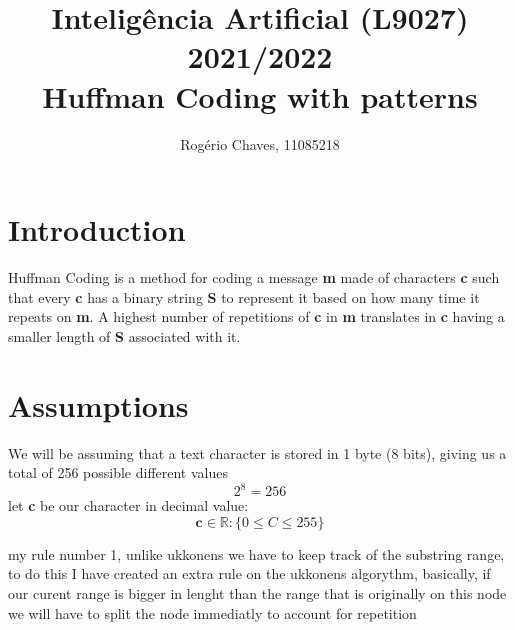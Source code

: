\documentclass[12pt]{article}
\begin{document}
\title{Inteligência Artificial (L9027) 2021/2022\\\textbf{Huffman Coding with patterns}}
\author{Rogério Chaves, 11085218}
\maketitle

\section{Introduction}
Huffman Coding is a method for coding a message \textbf{m} 
made of characters \textbf{c} such that every \textbf{c} has a 
binary string \textbf{S} to represent it based on how many time it repeats on \textbf{m}.
A highest number of repetitions of \textbf{c} in \textbf{m} translates in 
\textbf{c} having a smaller length of \textbf{S} associated with it.
\section{Assumptions}
We will be assuming that a text character is stored in 1 byte (8 bits), 
giving us a total of 256 possible different values
\begin{equation}2^8 = 256\end{equation}
let \textbf{c} be our character in decimal value:
\begin{equation}\textbf{c} \in \mathbb{R} : \{0\leq C\leq255\}\end{equation}























my rule number 1, unlike ukkonens we have to keep track of the substring
range, to do this I have created an extra rule on the ukkonens algorythm, basically, if our curent range is bigger in lenght than the range that is 
originally on this node we will have to split the node immediatly to account for repetition
\end{document}
